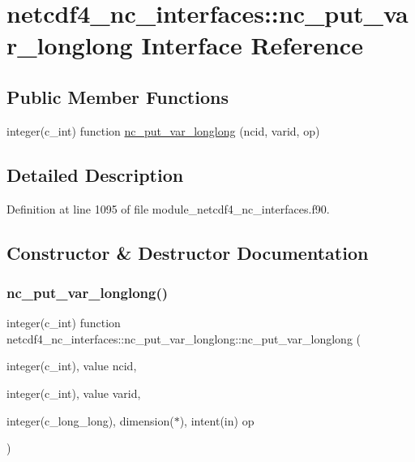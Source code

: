 \hypertarget{interfacenetcdf4__nc__interfaces_1_1nc__put__var__longlong}{}\section{netcdf4\+\_\+nc\+\_\+interfaces\+:\+:nc\+\_\+put\+\_\+var\+\_\+longlong Interface Reference}
\label{interfacenetcdf4__nc__interfaces_1_1nc__put__var__longlong}
\subsection*{Public Member Functions}
\begin{DoxyCompactItemize}
\item 
integer(c\+\_\+int) function \hyperlink{interfacenetcdf4__nc__interfaces_1_1nc__put__var__longlong_aab36bdda6891c93a9a7b2393db6034bb}{nc\+\_\+put\+\_\+var\+\_\+longlong} (ncid, varid, op)
\end{DoxyCompactItemize}


\subsection{Detailed Description}


Definition at line 1095 of file module\+\_\+netcdf4\+\_\+nc\+\_\+interfaces.\+f90.



\subsection{Constructor \& Destructor Documentation}
\mbox{\label{interfacenetcdf4__nc__interfaces_1_1nc__put__var__longlong_aab36bdda6891c93a9a7b2393db6034bb}} 
\subsubsection{\texorpdfstring{nc\+\_\+put\+\_\+var\+\_\+longlong()}{nc\_put\_var\_longlong()}}
{\footnotesize\ttfamily integer(c\+\_\+int) function netcdf4\+\_\+nc\+\_\+interfaces\+::nc\+\_\+put\+\_\+var\+\_\+longlong\+::nc\+\_\+put\+\_\+var\+\_\+longlong (\begin{DoxyParamCaption}\item[{integer(c\+\_\+int), value}]{ncid,  }\item[{integer(c\+\_\+int), value}]{varid,  }\item[{integer(c\+\_\+long\+\_\+long), dimension($\ast$), intent(in)}]{op }\end{DoxyParamCaption})}



